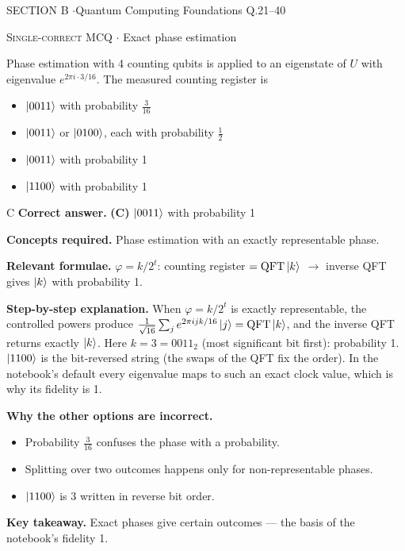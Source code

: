 \documentclass[11pt,a4paper]{article}
\newcommand{\optlabel}[1]{\textbf{(#1)}}
\newcommand{\correctlabel}[1]{\textcolor{okgreen}{\textbf{(#1)}\,\ding{51}}}
\newenvironment{qitem}[1]{\begin{list}{}{\setlength{\leftmargin}{3.3em}\setlength{\labelwidth}{3.1em}%
  \setlength{\labelsep}{0.2em}\setlength{\topsep}{3pt}\setlength{\parsep}{3pt}}\item[\textbf{Q.#1}\hfill]}{\end{list}}
\newcommand{\qsep}{\par\vspace{2pt}{\color{black!15}\hrule}\vspace{4pt}}
\newcommand{\qmeta}[2]{{\footnotesize\color{black!60}\textsc{#1} \;$\cdot$\; #2}\par}
\begin{document}
\newpage

\begin{sectionbanner}SECTION B \enspace$\cdot$\enspace Quantum Computing Foundations \hfill Q.21--40\end{sectionbanner}

\begin{qitem}{21}
\qmeta{Single-correct MCQ}{Exact phase estimation}
Phase estimation with 4 counting qubits is applied to an eigenstate of $U$ with eigenvalue $e^{2\pi i\cdot3/16}$. The measured counting register is
\begin{itemize}[leftmargin=2.6em, labelsep=0.4em, itemsep=2pt, topsep=3pt]
\item[\optlabel{A}] $\ket{0011}$ with probability $\tfrac{3}{16}$
\item[\optlabel{B}] $\ket{0011}$ or $\ket{0100}$, each with probability $\tfrac12$
\item[\correctlabel{C}] $\ket{0011}$ with probability 1
\item[\optlabel{D}] $\ket{1100}$ with probability 1
\end{itemize}
\end{qitem}
\begin{solbox}{C}
\textbf{\color{brand}Correct answer.} \textcolor{okgreen}{\textbf{(C)}} $\ket{0011}$ with probability 1

\textbf{\color{brand}Concepts required.} Phase estimation with an exactly representable phase.

\textbf{\color{brand}Relevant formulae.} $\varphi = k/2^t$: counting register $= \mathrm{QFT}\ket k$ $\to$ inverse QFT gives $\ket k$ with probability 1.

\textbf{\color{brand}Step-by-step explanation.} When $\varphi = k/2^t$ is exactly representable, the controlled powers produce $\frac{1}{\sqrt{16}}\sum_je^{2\pi i jk/16}\ket j = \mathrm{QFT}\ket k$, and the inverse QFT returns
exactly $\ket k$. Here $k = 3 = 0011_2$ (most significant bit first): probability 1. $\ket{1100}$ is the bit-reversed string (the swaps of the QFT fix
the order). In the notebook's default every eigenvalue maps to such an exact clock value, which is why its fidelity is 1.

\textbf{\color{brand}Why the other options are incorrect.}
\begin{itemize}[leftmargin=2.4em, itemsep=1pt, topsep=2pt]
\item[\textbf{(A)}] Probability $\frac3{16}$ confuses the phase with a probability.
\item[\textbf{(B)}] Splitting over two outcomes happens only for non-representable phases.
\item[\textbf{(D)}] $\ket{1100}$ is $3$ written in reverse bit order.
\end{itemize}
\textbf{\color{brand}Key takeaway.} Exact phases give certain outcomes --- the basis of the notebook's fidelity 1.
\end{solbox}
\qsep
\end{document}
